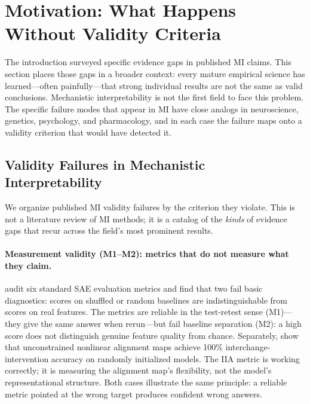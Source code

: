 \documentclass[10pt]{article}
\begin{document}
\section{Motivation: What Happens Without Validity Criteria}
\label{sec:motivation}

The introduction surveyed specific evidence gaps in published MI claims. This section places those gaps in a broader context: every mature empirical science has learned---often painfully---that strong individual results are not the same as valid conclusions. Mechanistic interpretability is not the first field to face this problem. The specific failure modes that appear in MI have close analogs in neuroscience, genetics, psychology, and pharmacology, and in each case the failure maps onto a validity criterion that would have detected it.

\subsection{Validity Failures in Mechanistic Interpretability}
\label{sec:mi-failures}

We organize published MI validity failures by the criterion they violate. This is not a literature review of MI methods; it is a catalog of the \emph{kinds} of evidence gaps that recur across the field's most prominent results.

\paragraph{Measurement validity (M1--M2): metrics that do not measure what they claim.}
\citet{karvonen2025saebench} audit six standard SAE evaluation metrics and find that two fail basic diagnostics: scores on shuffled or random baselines are indistinguishable from scores on real features. The metrics are reliable in the test-retest sense (M1)---they give the same answer when rerun---but fail baseline separation (M2): a high score does not distinguish genuine feature quality from chance. Separately, \citet{sutter2025nonlinear} show that unconstrained nonlinear alignment maps achieve 100\% interchange-intervention accuracy on randomly initialized models. The IIA metric is working correctly; it is measuring the alignment map's flexibility, not the model's representational structure. Both cases illustrate the same principle: a reliable metric pointed at the wrong target produces confident wrong answers.
\end{document}
